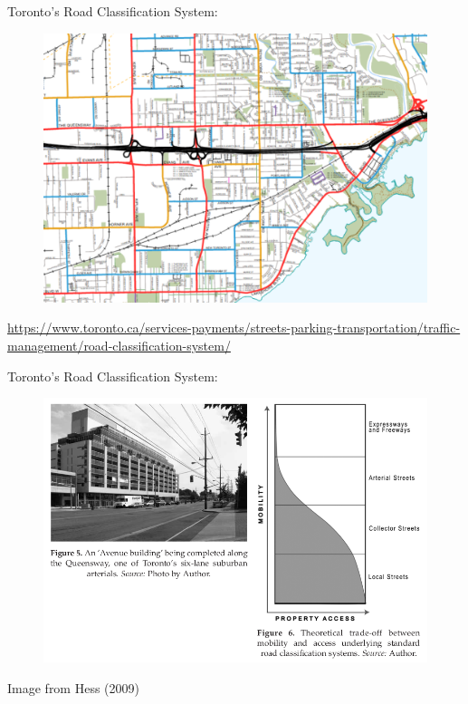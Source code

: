 \documentclass[aspectratio=169]{beamer}
\begin{document}
\begin{frame}
	
	Toronto's Road Classification System:
	
	\begin{figure}
		\centering
		\includegraphics[width=0.75\linewidth]{images/tor_road_heir.png}
		
	\end{figure}
	\tiny{\url{https://www.toronto.ca/services-payments/streets-parking-transportation/traffic-management/road-classification-system/}}
	
\end{frame}



\begin{frame}
	
	Toronto's Road Classification System:
	
	\begin{figure}
		\centering
		\includegraphics[width=0.75\linewidth]{images/road_heir_hes.png}
		
	\end{figure}
	\tiny Image from Hess (2009)
	
	
	
\end{frame}
\end{document}
